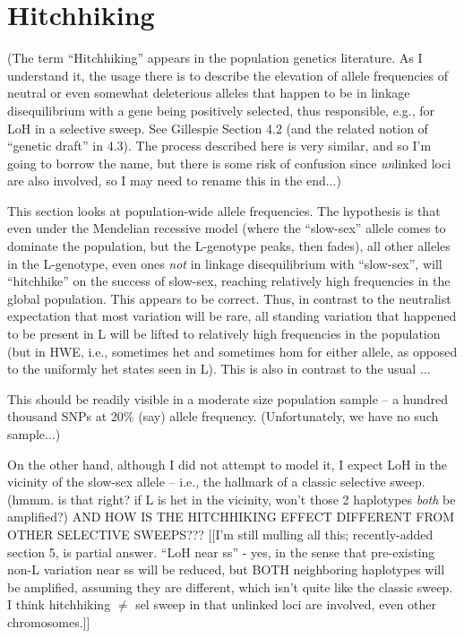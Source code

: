 \documentclass{article}\usepackage[]{graphicx}\usepackage[]{color}
\begin{document}
\section{Hitchhiking}
\label{sec:hitchhiking}

(The term ``Hitchhiking'' appears in the population genetics literature.  As I understand it, the
usage there is to describe the elevation of allele frequencies of neutral or even somewhat
deleterious alleles that happen to be in linkage disequilibrium with a gene being positively
selected, thus responsible, e.g., for LoH in a selective sweep.  See Gillespie Section 4.2 (and the
related notion of ``genetic draft'' in 4.3).  The process described here is very similar, and so I'm
going to borrow the name, but there is some risk of confusion since \textit{un}linked loci are also
involved, so I may need to rename this in the end...)

This section looks at population-wide allele frequencies.  The hypothesis is that even under the
Mendelian recessive model (where the ``slow-sex'' allele comes to dominate the population, but the
L-genotype peaks, then fades), all other alleles in the L-genotype, even ones \textit{not} in
linkage disequilibrium with ``slow-sex'', will ``hitchhike'' on the success of slow-sex, reaching
relatively high frequencies in the global population.  This appears to be correct.  Thus, in
contrast to the neutralist expectation that most variation will be rare, all standing variation that
happened to be present in L will be lifted to relatively high frequencies in the population (but in
HWE, i.e., sometimes het and sometimes hom for either allele, as opposed to the uniformly het states
seen in L).  This is also in contrast to the usual ...

This should be readily visible in a moderate size population sample -- a hundred thousand SNPs at
20\% (say) allele frequency.  (Unfortunately, we have no such sample...)

On the other hand, although I did not attempt to model it, I expect LoH in the vicinity of the
slow-sex allele -- i.e., the hallmark of a classic selective sweep.  (hmmm.  is that right?  if L is
het in the vicinity, won't those 2 haplotypes \textit{both} be amplified?)  AND HOW IS THE
HITCHHIKING EFFECT DIFFERENT FROM OTHER SELECTIVE SWEEPS???  [[I'm still mulling all this;
recently-added section 5, is partial answer.  ``LoH near ss'' - yes, in the sense that pre-existing
non-L variation near ss will be reduced, but BOTH neighboring haplotypes will be amplified, assuming
they are different, which isn't quite like the classic sweep.  I think hitchhiking $\ne$ sel sweep
in that unlinked loci are involved, even other chromosomes.]]
\end{document}
